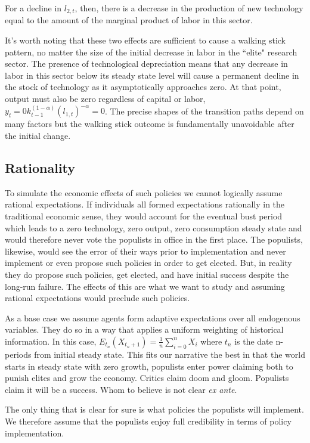 \documentclass{OUP-EJ}
\begin{document}
For a decline in $l_{2,t}$, then, there is a decrease in the production of new technology equal to the amount of the marginal product of labor in this sector.

It's worth noting that these two effects are sufficient to cause a walking stick pattern, no matter the size of the initial decrease in labor in the ``elite" research sector.  The presence of technological depreciation means that any decrease in labor in this sector below its steady state level will cause a permanent decline in the stock of technology as it asymptotically approaches zero. At that point, output must also be zero regardless of capital or labor, $y_t=0 k_{t-1}^{(1-\alpha)} (l_{1,t})^{-\alpha}=0$.  The precise shapes of the transition paths depend on many factors but the walking stick outcome is fundamentally unavoidable after the initial change.

\subsection{Rationality}

To simulate the economic effects of such policies we cannot logically assume rational expectations. If individuals all formed expectations rationally in the traditional economic sense, they would account for the eventual bust period which leads to a zero technology, zero output, zero consumption steady state and would therefore never vote the populists in office in the first place.  The populists, likewise, would see the error of their ways prior to implementation and never implement or even propose such policies in order to get elected. But, in reality they do propose such policies, get elected, and have initial success despite the long-run failure.  The effects of this are what we want to study and assuming rational expectations would preclude such policies.

As a base case we assume agents form adaptive expectations over all endogenous variables. They do so in a way that applies a uniform weighting of historical information.  In this case, $E_{t_n} (X_{t_n+1})=\frac{1}{n} \sum_{i=0}^{n} X_i$ where $t_n$ is the date n-periods from initial steady state.  This fits our narrative the best in that the world starts in steady state with zero growth, populists enter power claiming both to punish elites and grow the economy.  Critics claim doom and gloom. Populists claim it will be a success.  Whom to believe is not clear \textit{ex ante}.

The only thing that is clear for sure is what policies the populists will implement. We therefore assume that the populists enjoy full credibility in terms of policy implementation.
\end{document}
